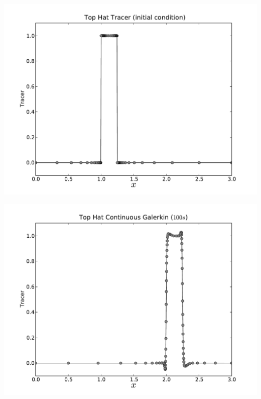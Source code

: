 \documentclass[12pt]{beamer}
\begin{document}
\begin{frame}
  \vspace{-1em}
  \begin{minipage}{0.5\textwidth}
    \includegraphics[width=\textwidth]{top_hat_ic}
  \end{minipage}%
  \begin{minipage}{0.5\textwidth}
    \includegraphics[width=\textwidth]{top_hat_cg}
  \end{minipage}


\end{frame}
\end{document}
